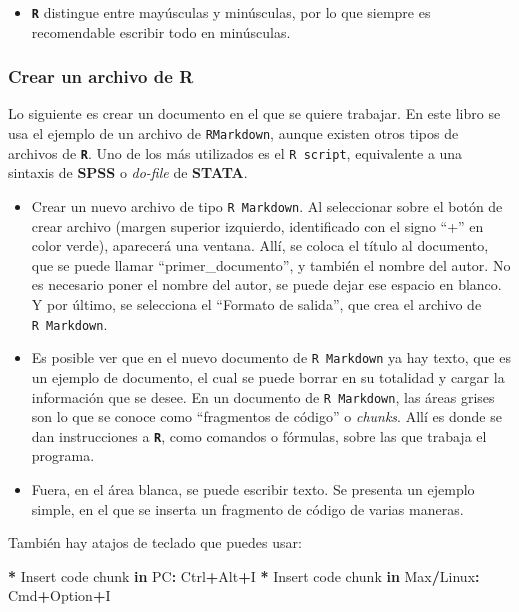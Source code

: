 \documentclass[
]{article}
\newenvironment{Shaded}{\begin{snugshade}}{\end{snugshade}}
\newcommand{\ControlFlowTok}[1]{\textcolor[rgb]{0.13,0.29,0.53}{\textbf{#1}}}
\newcommand{\NormalTok}[1]{#1}
\newcommand{\SpecialCharTok}[1]{\textcolor[rgb]{0.81,0.36,0.00}{\textbf{#1}}}
\providecommand{\tightlist}{%
  \setlength{\itemsep}{0pt}\setlength{\parskip}{0pt}}
\begin{document}
\begin{itemize}
\tightlist
\item
  \textbf{\texttt{R}} distingue entre mayúsculas y minúsculas, por lo que siempre es recomendable escribir todo en minúsculas.
\end{itemize}

\hypertarget{crear-un-archivo-de-r}{%
\subsubsection{Crear un archivo de R}\label{crear-un-archivo-de-r}}

Lo siguiente es crear un documento en el que se quiere trabajar. En este libro se usa el ejemplo de un archivo de \texttt{RMarkdown}, aunque existen otros tipos de archivos de \textbf{\texttt{R}}. Uno de los más utilizados es el \texttt{R\ script}, equivalente a una sintaxis de \textbf{SPSS} o \emph{do-file} de \textbf{STATA}.

\begin{itemize}
\item
  Crear un nuevo archivo de tipo \texttt{R\ Markdown}. Al seleccionar sobre el botón de crear archivo (margen superior izquierdo, identificado con el signo ``+'' en color verde), aparecerá una ventana. Allí, se coloca el título al documento, que se puede llamar ``primer\_documento'', y también el nombre del autor. No es necesario poner el nombre del autor, se puede dejar ese espacio en blanco. Y por último, se selecciona el ``Formato de salida'', que crea el archivo de \texttt{R\ Markdown}.
\item
  Es posible ver que en el nuevo documento de \texttt{R\ Markdown} ya hay texto, que es un ejemplo de documento, el cual se puede borrar en su totalidad y cargar la información que se desee. En un documento de \texttt{R\ Markdown}, las áreas grises son lo que se conoce como ``fragmentos de código'' o \emph{chunks}. Allí es donde se dan instrucciones a \textbf{\texttt{R}}, como comandos o fórmulas, sobre las que trabaja el programa.
\item
  Fuera, en el área blanca, se puede escribir texto. Se presenta un ejemplo simple, en el que se inserta un fragmento de código de varias maneras.
\end{itemize}

También hay atajos de teclado que puedes usar:

\begin{Shaded}
\begin{Highlighting}[]
\SpecialCharTok{*}\NormalTok{ Insert code chunk }\ControlFlowTok{in}\NormalTok{ PC}\SpecialCharTok{:}\NormalTok{ Ctrl}\SpecialCharTok{+}\NormalTok{Alt}\SpecialCharTok{+}\NormalTok{I}
\SpecialCharTok{*}\NormalTok{ Insert code chunk }\ControlFlowTok{in}\NormalTok{ Max}\SpecialCharTok{/}\NormalTok{Linux}\SpecialCharTok{:}\NormalTok{ Cmd}\SpecialCharTok{+}\NormalTok{Option}\SpecialCharTok{+}\NormalTok{I}
\end{Highlighting}
\end{Shaded}
\end{document}
